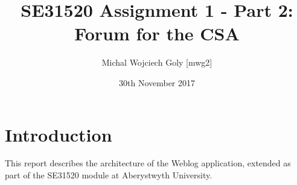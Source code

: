 \documentclass[a4paper, 11pt, titlepage]{article}
\title{SE31520 Assignment 1 - Part 2: Forum for the CSA}
\author{Michal Wojciech Goly [mwg2]}
\date{30th November 2017}
\begin{document}
\maketitle
\tableofcontents
\newpage

\section{Introduction}
This report describes the architecture of the Weblog application, extended as
part of the SE31520 module at Aberystwyth University.



%
%
\end{document}
